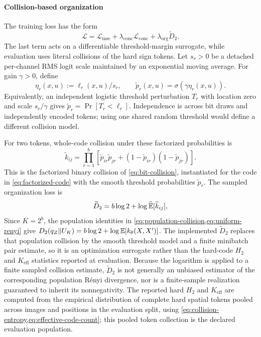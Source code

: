 \paragraph{Collision-based organization}
The training loss has the form
\begin{equation}
\mathcal L=\mathcal L_{\mathrm{mse}}
+\lambda_{\mathrm{conc}}\mathcal L_{\mathrm{conc}}
+\lambda_{\mathrm{org}}\widetilde D_2.
\label{eq:flowers-objective}
\end{equation}
The last term acts on a differentiable threshold-margin surrogate, while evaluation uses literal collisions of the hard sign tokens.
Let $s_r>0$ be a detached per-channel RMS logit scale maintained by an exponential moving average.
For gain $\gamma>0$, define
\begin{equation}
\eta_r(x,u):=\ell_r(x,u)/s_r,\qquad
\tilde p_r(x,u)=\sigma(\gamma\eta_r(x,u)).
\label{eq:flowers-threshold-probability}
\end{equation}
Equivalently, an independent logistic threshold perturbation $T_r$ with location zero and scale $s_r/\gamma$ gives $\tilde p_r=\Pr[T_r<\ell_r]$.
Independence is across bit draws and independently encoded tokens; using one shared random threshold would define a different collision model.

For two tokens, whole-code collision under these factorized probabilities is
\begin{equation}
\widetilde k_{ij}
=\prod_{r=1}^b\left[\tilde p_{ir}\tilde p_{jr}+(1-\tilde p_{ir})(1-\tilde p_{jr})\right].
\label{eq:flowers-threshold-collision}
\end{equation}
This is the factorized binary collision of \cref{eq:bit-collision}, instantiated for the code in \cref{eq:factorized-code} with the smooth threshold probabilities $\tilde p_r$.
The sampled organization loss is
\begin{equation}
\widetilde D_2=b\log2+\log\widehat{\mathbb{E}}[\widetilde k_{ij}],
\label{eq:flowers-separation}
\end{equation}
Since $K=2^b$, the population identities in \cref{eq:population-collision,eq:uniform-renyi} give $D_2(q_Z\|U_K)=b\log2+\log\mathbb{E}[k_\theta(X,X')]$.
The implemented $\widetilde D_2$ replaces that population collision by the smooth threshold model and a finite minibatch pair estimate, so it is an optimization surrogate rather than the hard-code $H_2$ and $K_{\mathrm{eff}}$ statistics reported at evaluation.
Because the logarithm is applied to a finite sampled collision estimate, $\widetilde D_2$ is not generally an unbiased estimator of the corresponding population R\'enyi divergence, nor is a finite-sample realization guaranteed to inherit its nonnegativity.
The reported hard $H_2$ and $K_{\mathrm{eff}}$ are computed from the empirical distribution of complete hard spatial tokens pooled across images and positions in the evaluation split, using \cref{eq:collision-entropy,eq:effective-code-count}; this pooled token collection is the declared evaluation population.

